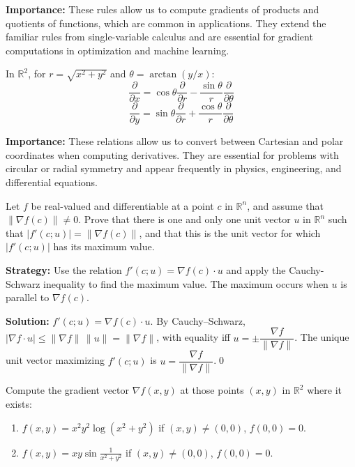 \noindent\textbf{Importance:} These rules allow us to compute gradients of products and quotients of functions, which are common in applications. They extend the familiar rules from single-variable calculus and are essential for gradient computations in optimization and machine learning.



\begin{theorem}
In $\mathbb{R}^2$, for $r = \sqrt{x^2 + y^2}$ and $\theta = \arctan(y/x)$:
\[\frac{\partial}{\partial x} = \cos \theta \frac{\partial}{\partial r} - \frac{\sin \theta}{r} \frac{\partial}{\partial \theta}\]
\[\frac{\partial}{\partial y} = \sin \theta \frac{\partial}{\partial r} + \frac{\cos \theta}{r} \frac{\partial}{\partial \theta}\]
\end{theorem}

\noindent\textbf{Importance:} These relations allow us to convert between Cartesian and polar coordinates when computing derivatives. They are essential for problems with circular or radial symmetry and appear frequently in physics, engineering, and differential equations.





\begin{problembox}
\begin{problemstatement}
Let \( f \) be real-valued and differentiable at a point \( c \) in \( \mathbb{R}^n \), and assume that \( \| \nabla f(c) \| \neq 0 \). Prove that there is one and only one unit vector \( u \) in \( \mathbb{R}^n \) such that \( |f'(c; u)| = \| \nabla f(c) \| \), and that this is the unit vector for which \( |f'(c; u)| \) has its maximum value.
\end{problemstatement}
\end{problembox}

\noindent\textbf{Strategy:} Use the relation \( f'(c; u) = \nabla f(c) \cdot u \) and apply the Cauchy-Schwarz inequality to find the maximum value. The maximum occurs when \( u \) is parallel to \( \nabla f(c) \).

\bigskip\noindent\textbf{Solution:}
$f'(c;u)=\nabla f(c)\cdot u$. By Cauchy–Schwarz, $|\nabla f\cdot u|\le\|\nabla f\|\,\|u\|=\|\nabla f\|$, with equality iff $u=\pm\dfrac{\nabla f}{\|\nabla f\|}$. The unique unit vector maximizing $f'(c;u)$ is $u=\dfrac{\nabla f}{\|\nabla f\|}$.\qed


\begin{problembox}
\begin{problemstatement}
Compute the gradient vector \( \nabla f(x, y) \) at those points \( (x, y) \) in \( \mathbb{R}^2 \) where it exists:
\begin{enumerate}[label=(\alph*)]
\item \( f(x, y) = x^2 y^2 \log (x^2 + y^2) \) if \( (x, y) \ne (0, 0) \), \( f(0, 0) = 0 \).
\item \( f(x, y) = xy \sin \frac{1}{x^2 + y^2} \) if \( (x, y) \ne (0, 0) \), \( f(0, 0) = 0 \).
\end{enumerate}
\end{problemstatement}
\end{problembox}

